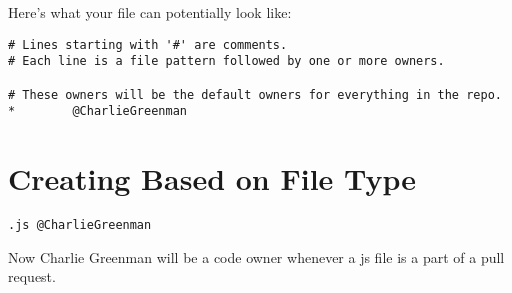 Here's what your \codeowners{} file can potentially look like: 

\begin{lstlisting}
# Lines starting with '#' are comments.
# Each line is a file pattern followed by one or more owners.

# These owners will be the default owners for everything in the repo.
*        @CharlieGreenman

\end{lstlisting}

\section{ Creating \codeowners{} Based on File Type }
\begin{lstlisting}
.js @CharlieGreenman
\end{lstlisting}

Now Charlie Greenman will be a code owner whenever a js file is a part of a pull request.

